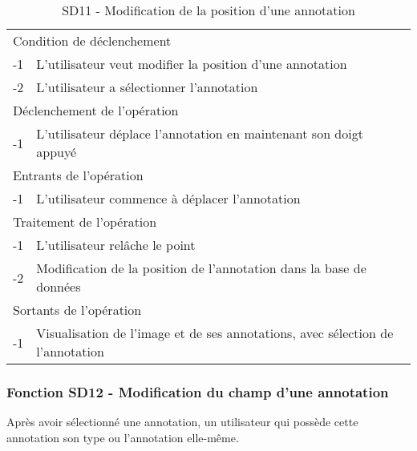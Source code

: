 \documentclass[a4paper]{article}
\begin{document}
\begin{table}[H]
  \centering
   \small
	\begin{tabular}{|c|p{12cm}|}
   		\hline
   			\rowcolor{lightgray}\multicolumn{2}{|c|}{\textbf{SD11 - Modification de la position d’une annotation}} \\
   		\hline
   			\multicolumn{2}{|l|}{Condition de d\'eclenchement} \\
   		\hline
   			-1 & L’utilisateur veut modifier la position d’une annotation\\
			-2 & L’utilisateur a sélectionner l’annotation\\
   		\hline
   			\multicolumn{2}{|l|}{D\'eclenchement de l'op\'eration} \\
   		\hline
   			-1 & L’utilisateur déplace l’annotation en maintenant son doigt appuyé\\
   		\hline
   			\multicolumn{2}{|l|}{Entrants de l'op\'eration} \\
   		\hline
   			-1 & L’utilisateur commence à déplacer l’annotation\\
   		\hline
   			\multicolumn{2}{|l|}{Traitement de l'op\'eration} \\
  		\hline
   			-1 & L’utilisateur relâche le point\\
			-2 & Modification de la position de l’annotation dans la base de données\\
   		\hline
   			\multicolumn{2}{|l|}{Sortants de l'op\'eration} \\
   		\hline
   			-1 & Visualisation de l’image et de ses annotations, avec sélection de l’annotation\\
   		\hline
	\end{tabular}
  \caption{SD11 - Modification de la position d’une annotation}
  \normalsize
  \label{tab:modification_position_annotation}
\end{table}

\subsubsection{Fonction SD12 - Modification du champ d’une annotation}
Après avoir sélectionné une annotation, un utilisateur qui possède cette annotation son type ou l’annotation elle-même.\\
\end{document}
